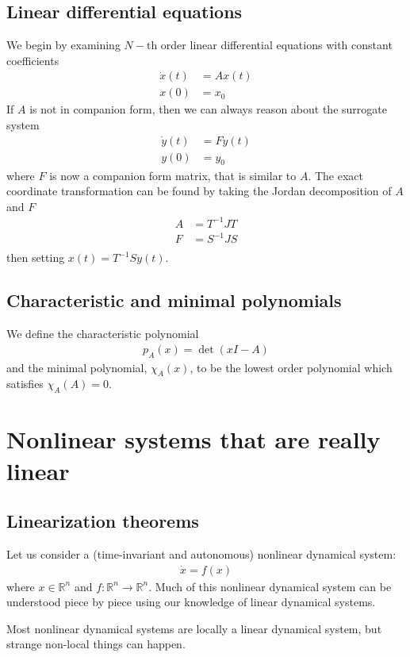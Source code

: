 \documentclass[a4paper,11pt]{exam}
\newcounter{ct}
\newcommand{\field}[1]{\ensuremath{\mathbb{#1}}}
\newcommand{\reals}{\field{R}}
\begin{document}
\subsection{Linear differential equations}
We begin by examining $N-\text{th}$ order linear differential equations with constant coefficients
\begin{align}
    \dot{x}(t) &= A x(t)\\
    x(0) &= x_0
\end{align}
If $A$ is not in companion form, then we can always reason about the surrogate system
\begin{align}
    \dot{y}(t) &= F y(t)\\
    y(0) &= y_0
\end{align}
where $F$ is now a companion form matrix, that is similar to $A$.  The exact coordinate transformation can be found by taking the Jordan decomposition of $A$ and $F$
\begin{align}
    A &= T^{-1} J T\\
    F &= S^{-1} J S\\
\end{align}
then setting $x(t) = T^{-1} S y(t)$.
\subsection{Characteristic and minimal polynomials}
We define the characteristic polynomial 
\begin{align}
    p_{A}(x) = \det \left( x I - A \right)
\end{align}
and the minimal polynomial, $\chi_A(x)$, to be the lowest order polynomial which satisfies $\chi_A(A) = 0$.

\section{Nonlinear systems that are really linear}
\subsection{Linearization theorems}
Let us consider a (time-invariant and autonomous) nonlinear dynamical system:
\begin{align}
    \dot{x} = f(x)
\end{align}
where $x \in \reals^n$ and $f: \reals^n \to \reals^n$.
Much of this nonlinear dynamical system can be understood piece by piece using our knowledge of linear dynamical systems.

\begin{tcolorbox}[colback=black!1!,title=Linearize that beast!]
    Most nonlinear dynamical systems are locally a linear dynamical system, but strange non-local things can happen.
\end{tcolorbox}
\end{document}
